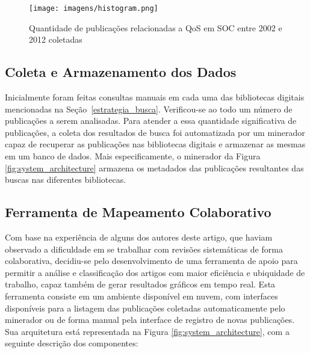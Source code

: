 \begin{figure}[htb]
\centering
\texttt{[image: imagens/histogram.png]}
\caption{Quantidade de publica\c c\~{o}es relacionadas a QoS em SOC entre 2002 e 2012 coletadas}
\label{fig:barplotAnoPublicacoes}
\end{figure}

\subsection{Coleta e Armazenamento dos Dados}

Inicialmente foram feitas consultas manuais em cada uma das bibliotecas digitais mencionadas na Se\c c\~{a}o~\ref{estrategia_busca}. Verificou-se ao todo um número de \AllPubs publicações a serem analisadas. Para atender a essa quantidade significativa de publica\c c\~{o}es, a coleta dos resultados de busca foi automatizada por um minerador capaz de recuperar as publica\c c\~{o}es nas bibliotecas digitais e armazenar as mesmas em um banco de dados. Mais especificamente, o minerador da Figura \ref{fig:system_architecture} armazena os metadados das publicações resultantes das buscas nas diferentes bibliotecas. 


\subsection{Ferramenta de Mapeamento Colaborativo}

Com base na experi\^{e}ncia de alguns dos autores deste artigo, que haviam observado a dificuldade em se trabalhar com revis\~{o}es sistem\'{a}ticas de forma colaborativa, decidiu-se pelo desenvolvimento de uma ferramenta de apoio para permitir a an\'{a}lise e classifica\c c\~{a}o dos artigos com maior eficiência e ubiquidade de trabalho, capaz também de gerar resultados gr\'{a}ficos em tempo real. Esta ferramenta consiste em um ambiente disponível em nuvem, com interfaces disponíveis para a listagem das publicações coletadas automaticamente pelo minerador ou de forma manual pela interface de registro de novas publicações. Sua arquitetura está representada na Figura \ref{fig:system_architecture}, com a seguinte descrição dos componentes:

